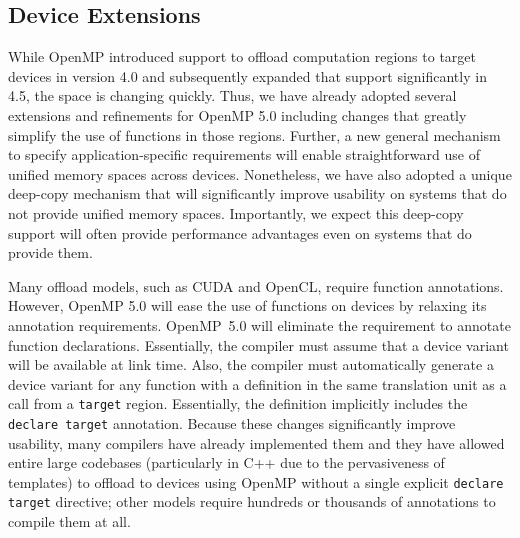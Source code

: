 \subsection{Device Extensions}
\label{sub:device_extensions}

While OpenMP introduced support to offload computation regions to target 
devices in version 4.0 and subsequently expanded that support significantly 
in 4.5, the space is changing quickly. Thus, we have already adopted several
extensions and refinements for OpenMP 5.0 including changes that greatly 
simplify the use of functions in those regions. Further, a new general 
mechanism to specify application-specific requirements will enable 
straightforward use of unified memory spaces across devices. Nonetheless, 
we have also adopted a unique deep-copy mechanism that will significantly
improve usability on systems that do not provide unified memory spaces.
Importantly, we expect this deep-copy support will often provide performance 
advantages even on systems that do provide them.

Many offload models, such as CUDA and OpenCL, require function annotations. 
However, OpenMP 5.0 will ease the use of functions on devices by relaxing 
its annotation requirements. OpenMP~5.0 will eliminate the requirement to 
annotate function declarations. Essentially, the compiler must assume that 
a device variant will be available at link time. Also, the compiler must 
automatically generate a device variant for any function with a definition 
in the same translation unit as a call from a \texttt{target} region. 
Essentially, the definition implicitly includes the \texttt{declare target} 
annotation. Because these changes significantly improve usability, many 
compilers have already implemented them and they have allowed entire large 
codebases (particularly in C++ due to the pervasiveness of templates) to 
offload to devices using OpenMP without a single explicit \texttt{declare 
target} directive; other models require hundreds or thousands of annotations 
to compile them at all.

